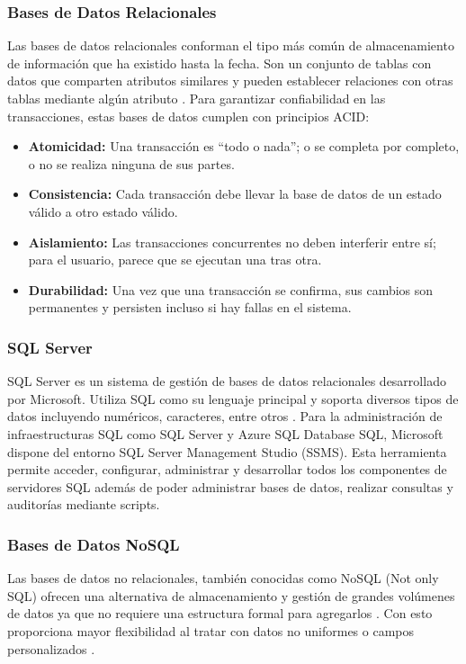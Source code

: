 \subsubsection{Bases de Datos Relacionales}
Las bases de datos relacionales conforman el tipo más común de almacenamiento de información que ha existido hasta la fecha. Son un conjunto de tablas con datos que comparten atributos similares y pueden establecer relaciones con otras tablas mediante algún atributo \cite{ricardo2009bases}.  Para garantizar confiabilidad en las transacciones, estas bases de datos cumplen con principios ACID:
\begin{itemize}
    \item \textbf{Atomicidad:} Una transacción es ``todo o nada''; o se completa por completo, o no se realiza ninguna de sus partes.
    \item \textbf{Consistencia:} Cada transacción debe llevar la base de datos de un estado válido a otro estado válido.
    \item \textbf{Aislamiento:} Las transacciones concurrentes no deben interferir entre sí; para el usuario, parece que se ejecutan una tras otra.
    \item \textbf{Durabilidad:} Una vez que una transacción se confirma, sus cambios son permanentes y persisten incluso si hay fallas en el sistema. 
\end{itemize}

\subsubsection{SQL Server}
SQL Server es un sistema de gestión de bases de datos relacionales desarrollado por Microsoft. Utiliza SQL como su lenguaje principal y soporta diversos tipos de datos incluyendo numéricos, caracteres, entre otros  \cite{ricardo2009bases}. Para la administración de infraestructuras SQL como SQL Server y Azure SQL Database SQL, Microsoft dispone del entorno SQL Server Management Studio (SSMS). Esta herramienta permite acceder, configurar, administrar y desarrollar todos los componentes de servidores SQL además de poder administrar bases de datos, realizar consultas y auditorías mediante scripts.

\subsubsection{Bases de Datos NoSQL}
Las bases de datos no relacionales, también conocidas como NoSQL (Not only SQL) ofrecen una alternativa de almacenamiento y gestión de grandes volúmenes de datos ya que no requiere una estructura formal para agregarlos \cite{sullivan2015nosql}. Con esto proporciona mayor flexibilidad al tratar con datos no uniformes o campos personalizados \cite{hills2016nosql}. 

